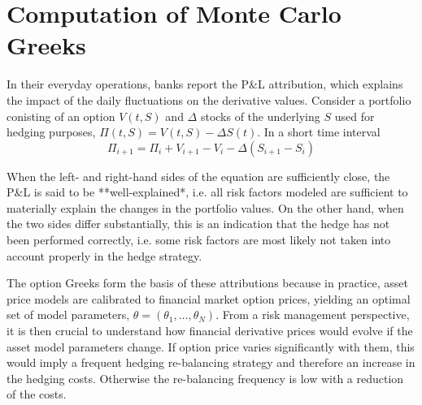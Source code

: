 
\section{Computation of Monte Carlo Greeks}

In their everyday operations, banks report the P\&L attribution, which explains the impact of the daily fluctuations on the derivative values. Consider a portfolio conisting of an option $V(t,S)$ and $\Delta$ stocks of the underlying $S$ used for hedging purposes, $\Pi(t,S)=V(t,S)-\Delta S(t)$.
In a short time interval
$$
\Pi_{i+1} = \Pi_i + V_{i+1} - V_i - \Delta(S_{i+1}-S_i)
$$

When the left- and right-hand sides of the equation are sufficiently close, the P\&L is said to be **well-explained*, i.e. all risk factors modeled are sufficient to materially explain the changes in the portfolio
values. On the other hand, when the two sides differ substantially, this is an indication that the hedge has not been performed correctly, i.e. some risk factors are most likely not taken into account properly in the hedge strategy.

The option Greeks form the basis of these attributions because in practice, asset price models are calibrated to financial market option prices, yielding an optimal set of model parameters, $\theta = (\theta_1,\ldots, \theta_N)$.
From a risk management perspective, it is then crucial to understand how financial derivative prices would evolve if the asset model parameters change. If option price varies significantly with them, this would imply a
frequent hedging re-balancing strategy and therefore an increase in the hedging costs. Otherwise the re-balancing frequency is low with a reduction of the costs.

